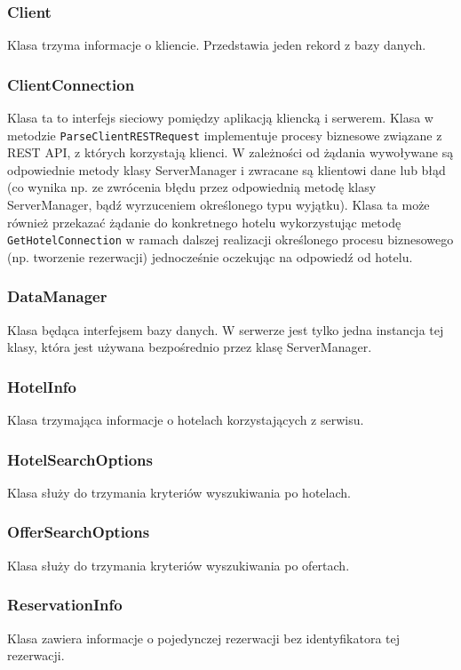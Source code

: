 \documentclass{article}
\begin{document}
\subsubsection{Client}
Klasa trzyma informacje o kliencie.
Przedstawia jeden rekord z bazy danych.

\subsubsection{ClientConnection}
Klasa ta to interfejs sieciowy pomiędzy aplikacją kliencką i serwerem. Klasa w metodzie \texttt{ParseClientRESTRequest} implementuje procesy biznesowe związane z REST API, z których korzystają klienci. W zależności od żądania wywoływane są odpowiednie metody klasy ServerManager i zwracane są klientowi dane lub błąd (co wynika np. ze zwrócenia błędu przez odpowiednią metodę klasy ServerManager, bądź wyrzuceniem określonego typu wyjątku). Klasa ta może również przekazać żądanie do konkretnego hotelu wykorzystując metodę \texttt{GetHotelConnection} w ramach dalszej realizacji określonego procesu biznesowego (np. tworzenie rezerwacji) jednocześnie oczekując na odpowiedź od hotelu.

\subsubsection{DataManager}\label{serverModuleDataManager}
Klasa będąca interfejsem bazy danych. W serwerze jest tylko jedna instancja tej klasy, która jest używana bezpośrednio przez klasę ServerManager.

\subsubsection{HotelInfo}
Klasa trzymająca informacje o hotelach korzystających z serwisu.

\subsubsection{HotelSearchOptions}
Klasa służy do trzymania kryteriów wyszukiwania po hotelach.

\subsubsection{OfferSearchOptions}
Klasa służy do trzymania kryteriów wyszukiwania po ofertach.

\subsubsection{ReservationInfo}
Klasa zawiera informacje o pojedynczej rezerwacji bez identyfikatora tej rezerwacji.
\end{document}
